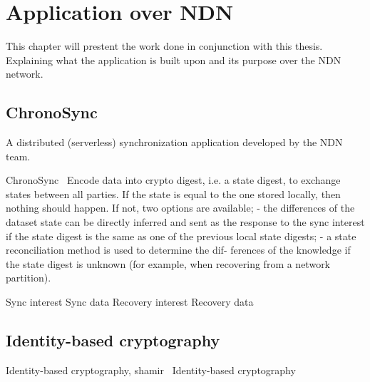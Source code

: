 \chapter{Application over \gls{NDN}}\label{chp3:application}
This chapter will prestent the work done in conjunction with this thesis. 
Explaining what the application is built upon and its purpose over the \gls{NDN} network. 

\section{ChronoSync}
A distributed (serverless) synchronization application developed by the \gls{NDN} team. 

ChronoSync~\cite{DBLP:conf/icnp/ZhuA13}
Encode data into crypto digest, i.e. a state digest, to exchange states between all parties. 
If the state is equal to the one stored locally, then nothing should happen.
If not, two options are available; 
- the differences of the dataset state can be directly inferred
and sent as the response to the sync interest if the state
digest is the same as one of the previous local state
digests;
- a state reconciliation method is used to determine the dif-
ferences of the knowledge if the state digest is unknown
(for example, when recovering from a network partition).

Sync interest
Sync data
Recovery interest
Recovery data

\section{Identity-based cryptography}
Identity-based cryptography, shamir~\cite{DBLP:conf/crypto/Shamir84}
Identity-based cryptography~\cite{DBLP:conf/icnp/ZhangCXWSW11}


